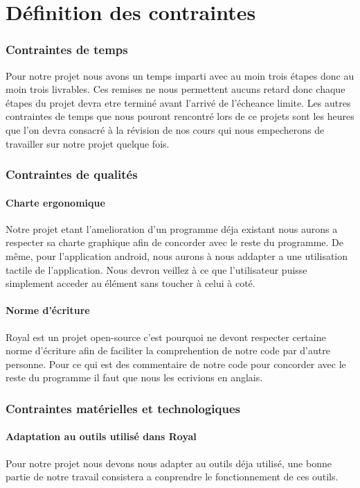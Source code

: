 \part{Définition des contraintes}


\section{Contraintes de temps}
Pour notre projet nous avons un temps imparti avec au moin trois étapes donc au moin trois livrables. Ces remises ne nous permettent aucuns retard donc chaque étapes du projet devra etre terminé avant l'arrivé de l'écheance limite. Les autres contraintes de temps que nous pouront rencontré lors de ce projets sont les heures que l'on devra consacré à la révision de nos cours qui nous empecherons de travailler sur notre projet quelque fois.  

\section{Contraintes de qualités}

\subsection{Charte ergonomique}
Notre projet etant l'amelioration d'un programme déja existant nous aurons a respecter sa charte graphique afin de concorder avec le reste du programme. De même, pour l'application android, nous aurons à nous addapter a une utilisation tactile de l'application. Nous devron veillez à ce que l'utilisateur puisse simplement acceder au élément sans toucher à celui à coté.  

\subsection{Norme d'écriture}
Royal est un projet open-source c'est pourquoi ne devont respecter certaine norme d'écriture afin de faciliter la comprehention de notre code par d'autre personne. Pour ce qui est des commentaire de notre code pour concorder avec le reste du programme il faut que nous les ecrivions en anglais.

\section{Contraintes matérielles et technologiques}

\subsection{Adaptation au outils utilisé dans Royal}
Pour notre projet nous devons nous adapter au outils déja utilisé, une bonne partie de notre travail consistera a conprendre le fonctionnement de ces outils.

